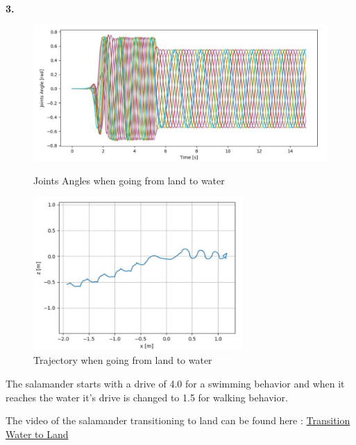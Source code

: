 \documentclass{cmc}
\begin{document}
\textbf{3.}
\begin{figure}[H]
\centering

\includegraphics[width=16cm]{9g2_joints.JPG}
\caption{Joints Angles when going from land to water}

\centering

\includegraphics[width=8cm]{9g2_gps.JPG}
\caption{Trajectory when going from land to water}

\label{fig:9g2}
\end{figure}

The salamander starts with a drive of 4.0 for a swimming behavior and when it reaches the water it's drive is changed to 1.5 for walking behavior. 

The video of the salamander transitioning to land can be found here : \href{https://drive.google.com/open?id=1SsjYRnM28c-Y93Ew06Xjhznf4al96TmY}{Transition Water to Land}




\newpage


\label{sec:references}




\end{document}
